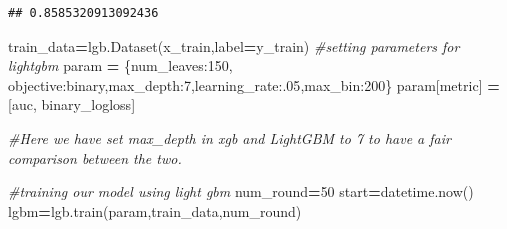 \documentclass[
]{book}
\newenvironment{Shaded}{\begin{snugshade}}{\end{snugshade}}
\newcommand{\CommentTok}[1]{\textcolor[rgb]{0.56,0.35,0.01}{\textit{#1}}}
\newcommand{\DecValTok}[1]{\textcolor[rgb]{0.00,0.00,0.81}{#1}}
\newcommand{\FloatTok}[1]{\textcolor[rgb]{0.00,0.00,0.81}{#1}}
\newcommand{\NormalTok}[1]{#1}
\newcommand{\OperatorTok}[1]{\textcolor[rgb]{0.81,0.36,0.00}{\textbf{#1}}}
\newcommand{\StringTok}[1]{\textcolor[rgb]{0.31,0.60,0.02}{#1}}
\begin{document}
\begin{verbatim}
## 0.8585320913092436
\end{verbatim}

\begin{Shaded}
\begin{Highlighting}[]
\NormalTok{train\_data}\OperatorTok{=}\NormalTok{lgb.Dataset(x\_train,label}\OperatorTok{=}\NormalTok{y\_train)}
\CommentTok{\#setting parameters for lightgbm}
\NormalTok{param }\OperatorTok{=}\NormalTok{ \{}\StringTok{\textquotesingle{}num\_leaves\textquotesingle{}}\NormalTok{:}\DecValTok{150}\NormalTok{, }\StringTok{\textquotesingle{}objective\textquotesingle{}}\NormalTok{:}\StringTok{\textquotesingle{}binary\textquotesingle{}}\NormalTok{,}\StringTok{\textquotesingle{}max\_depth\textquotesingle{}}\NormalTok{:}\DecValTok{7}\NormalTok{,}\StringTok{\textquotesingle{}learning\_rate\textquotesingle{}}\NormalTok{:}\FloatTok{.05}\NormalTok{,}\StringTok{\textquotesingle{}max\_bin\textquotesingle{}}\NormalTok{:}\DecValTok{200}\NormalTok{\}}
\NormalTok{param[}\StringTok{\textquotesingle{}metric\textquotesingle{}}\NormalTok{] }\OperatorTok{=}\NormalTok{ [}\StringTok{\textquotesingle{}auc\textquotesingle{}}\NormalTok{, }\StringTok{\textquotesingle{}binary\_logloss\textquotesingle{}}\NormalTok{]}

\CommentTok{\#Here we have set max\_depth in xgb and LightGBM to 7 to have a fair comparison between the two.}

\CommentTok{\#training our model using light gbm}
\NormalTok{num\_round}\OperatorTok{=}\DecValTok{50}
\NormalTok{start}\OperatorTok{=}\NormalTok{datetime.now()}
\NormalTok{lgbm}\OperatorTok{=}\NormalTok{lgb.train(param,train\_data,num\_round)}
\end{Highlighting}
\end{Shaded}
\end{document}
